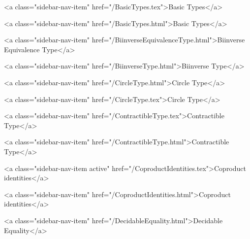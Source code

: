       
        
          <a class="sidebar-nav-item" href="/BasicTypes.tex">Basic Types</a>
        
      
    
      
        
          <a class="sidebar-nav-item" href="/BasicTypes.html">Basic Types</a>
        
      
    
      
        
          <a class="sidebar-nav-item" href="/BiinverseEquivalenceType.html">Biinverse Equivalence Type</a>
        
      
    
      
        
          <a class="sidebar-nav-item" href="/BiinverseType.html">Biinverse Type</a>
        
      
    
      
        
          <a class="sidebar-nav-item" href="/CircleType.html">Circle Type</a>
        
      
    
      
        
          <a class="sidebar-nav-item" href="/CircleType.tex">Circle Type</a>
        
      
    
      
        
          <a class="sidebar-nav-item" href="/ContractibleType.tex">Contractible Type</a>
        
      
    
      
        
          <a class="sidebar-nav-item" href="/ContractibleType.html">Contractible Type</a>
        
      
    
      
        
          <a class="sidebar-nav-item active" href="/CoproductIdentities.tex">Coproduct identities</a>
        
      
    
      
        
          <a class="sidebar-nav-item" href="/CoproductIdentities.html">Coproduct identities</a>
        
      
    
      
        
          <a class="sidebar-nav-item" href="/DecidableEquality.html">Decidable Equality</a>
        
